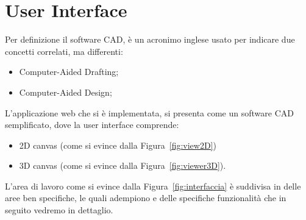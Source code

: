 \section{User Interface}
\label{sec:chapter_2_section_2}

Per definizione il software CAD, è un acronimo inglese usato per indicare due concetti correlati, ma differenti:
\begin{itemize}
  \item Computer-Aided Drafting;
  \item Computer-Aided Design;
\end{itemize}
L'applicazione web che si è implementata, si presenta come un software CAD semplificato, dove la
user interface comprende:
\begin{itemize}
  \item 2D canvas (come si evince dalla Figura~\ref{fig:view2D})
  \item 3D canvas (come si evince dalla Figura~\ref{fig:viewer3D}).
\end{itemize}

L'area di lavoro come si evince dalla Figura~\ref{fig:interfaccia} è suddivisa in delle aree ben specifiche,
le quali adempiono e delle specifiche funzionalità che in seguito vedremo in dettaglio.\\

